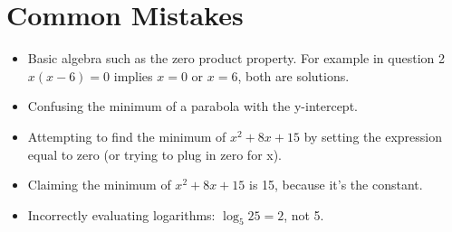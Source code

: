 \documentclass[a4paper, 12pt]{article}
\begin{document}
\newpage

\section*{Common Mistakes}

\begin{itemize}
    \item Basic algebra such as the zero product property. For example in question 2$x(x-6) = 0$ implies $x=0$ or $x=6$, both are solutions.
    \item Confusing the minimum of a parabola with the y-intercept. 
    \item Attempting to find the minimum of $x^2 + 8x + 15$ by setting the expression equal to zero (or trying to plug in zero for x).
    \item Claiming the minimum of $x^2 + 8x +15 $ is 15, because it's the constant.
    \item Incorrectly evaluating logarithms: $\log_5 25 = 2$, not 5.
\end{itemize}
\end{document}
